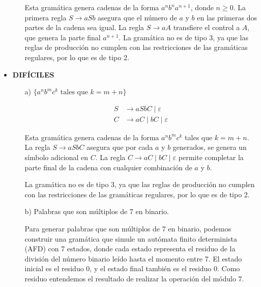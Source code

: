 \documentclass[12pt]{book} %
\begin{document}
\begin{ejercicio}
\begin{itemize}
\begin{itemize}
\begin{solucion}[media.d]
        Esta gramática genera cadenas de la forma $a^n b^n a^{n+1}$, donde $n \geq 0$. La primera regla $S \rightarrow aSb$ asegura que el número de $a$ y $b$ en las primeras dos partes de la cadena sea igual. La regla $S \rightarrow aA$ transfiere el control a $A$, que genera la parte final $a^{n+1}$. La gramática no es de tipo 3, ya que las reglas de producción no cumplen con las restricciones de las gramáticas regulares, por lo que es de tipo 2.

        \end{solucion}


    \end{itemize}

    \item \textbf{DIFÍCILES}
    \begin{itemize}
        \item[a)] $\{a^n b^m c^k \text{ tales que } k = m + n\}$


        \begin{solucion}[difícil.a]

        \begin{align*}
        S &\rightarrow aSbC \mid \varepsilon \\
        C &\rightarrow aC \mid bC \mid \varepsilon
        \end{align*}

        Esta gramática genera cadenas de la forma $a^n b^m c^k$ tales que $k = m + n$. La regla $S \rightarrow aSbC$ asegura que por cada $a$ y $b$ generados, se genera un símbolo adicional en $C$. La regla $C \rightarrow aC \mid bC \mid \varepsilon$ permite completar la parte final de la cadena con cualquier combinación de $a$ y $b$.

        La gramática no es de tipo 3, ya que las reglas de producción no cumplen con las restricciones de las gramáticas regulares, por lo que es de tipo 2.

        \end{solucion}



        \item[b)] Palabras que son múltiplos de 7 en binario.


        \begin{solucion}[difícil.b]

        Para generar palabras que son múltiplos de 7 en binario, podemos construir una gramática que simule un autómata finito determinista (AFD) con 7 estados, donde cada estado representa el residuo de la división del número binario leído hasta el momento entre 7. El estado inicial es el residuo 0, y el estado final también es el residuo 0. Como residuo entendemos el resultado de realizar la operación del módulo 7.


\end{solucion}
\end{itemize}
\end{itemize}
\end{ejercicio}
\end{document}
